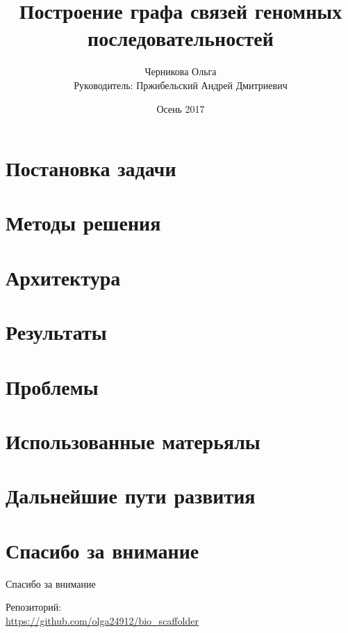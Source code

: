 \documentclass{beamer}
\title[Граф связей между контигами]{Построение графа связей геномных последовательностей}
\author[Черникова Ольга]{Черникова Ольга\\
	Руководитель: Пржибельский Андрей Дмитриевич}
\institute{СПб АУ РАН}
\date{Осень 2017}
\begin{document}
\begin{frame}
	\titlepage
\end{frame}

\section{Постановка задачи}

\section{Методы решения}

\section{Архитектура}

\section{Результаты}

\section{Проблемы}

\section{Использованные матерьялы}

\section{Дальнейшие пути развития}

\section{Спасибо за внимание}
\begin{frame}{Спасибо за внимание}
    \begin{center}
        Репозиторий: \\ \url{https://github.com/olga24912/bio_scaffolder}
    \end{center}
\end{frame}
\end{document}
